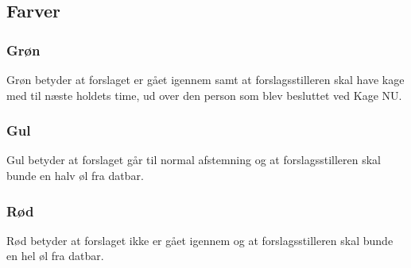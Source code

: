 \documentclass{article}
\begin{document}
	\subsection{Farver}
	\subsubsection{Grøn}
	Grøn betyder at forslaget er gået igennem samt at forslagsstilleren skal have kage med til næste holdets time, ud over den person som blev besluttet ved Kage NU. 
	\subsubsection{Gul}
	Gul betyder at forslaget går til normal afstemning og at forslagsstilleren skal bunde en halv øl fra datbar. 
	\subsubsection{Rød}
	Rød betyder at forslaget ikke er gået igennem og at forslagsstilleren skal bunde en hel øl fra datbar.
	
	
	\vfill
	\doclicenseThis
\end{document}
